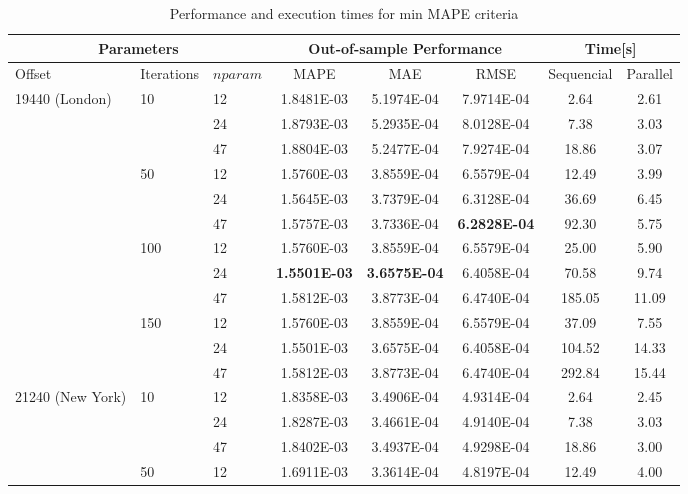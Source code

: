 \begin{table}[ht!]
\tiny
\caption{Performance and execution times for min MAPE criteria}
\label{tab:stats}
\begin{center}
\begin{tabular}{|l|l|l|c|c|c|c|c|}
\hline
\multicolumn{3}{|c}{Parameters} & 
\multicolumn{3}{|c}{Out-of-sample Performance} &
\multicolumn{2}{|c|}{Time[s]} \\ 
\hline

\hline
Offset & Iterations & $nparam$ & 
MAPE & MAE& RMSE& 
Sequencial & Parallel \\
\hline
 \multirow{12}{*}{19440 (London)} &
 \multirow{3}{*}{10} 
  &  12 & 1.8481E-03 & 5.1974E-04 & 7.9714E-04 & 2.64 & 2.61    \\
 &&  24 & 1.8793E-03 & 5.2935E-04 & 8.0128E-04 & 7.38 & 3.03 \\ 
 &&  47 & 1.8804E-03 & 5.2477E-04 & 7.9274E-04 & 18.86 & 3.07 \\ 
 \cline{2-8} 
 & \multirow{3}{*}{50} 
 &  12&  1.5760E-03 & 3.8559E-04 & 6.5579E-04 & 12.49 & 3.99 \\
 && 24 & 1.5645E-03 & 3.7379E-04 & 6.3128E-04 & 36.69 & 6.45 \\
 && 47 & 1.5757E-03 & 3.7336E-04 & \textbf{6.2828E-04} & 92.30 & 5.75 \\
 \cline{2-8} 
 & \multirow{3}{*}{100} 
 &  12&  1.5760E-03 & 3.8559E-04 & 6.5579E-04 & 25.00 & 5.90 \\ 
 && 24 & \textbf{1.5501E-03} & \textbf{3.6575E-04} & 6.4058E-04 & 70.58 & 9.74 \\ 
 && 47 & 1.5812E-03 & 3.8773E-04 & 6.4740E-04 & 185.05 & 11.09 \\
 \cline{2-8} 
 & \multirow{3}{*}{150} 
 &  12&  1.5760E-03 & 3.8559E-04 & 6.5579E-04 & 37.09 & 7.55 \\ 
 && 24 & 1.5501E-03 & 3.6575E-04 & 6.4058E-04 & 104.52 & 14.33 \\
 && 47 & 1.5812E-03 & 3.8773E-04 & 6.4740E-04 & 292.84 & 15.44 \\
\hline
\hline
 \multirow{12}{*}{21240 (New York)} &
 \multirow{3}{*}{10} 
  &  12 & 1.8358E-03 & 3.4906E-04 & 4.9314E-04 & 2.64 & 2.45 \\
 &&  24 & 1.8287E-03 & 3.4661E-04 & 4.9140E-04 & 7.38 & 3.03 \\
 &&  47 & 1.8402E-03 & 3.4937E-04 & 4.9298E-04 & 18.86 & 3.00 \\
 \cline{2-8} 
 & \multirow{3}{*}{50} 
 &  12&  1.6911E-03 & 3.3614E-04 & 4.8197E-04 & 12.49 & 4.00 \\

\end{tabular}
\end{center}
\end{table}
